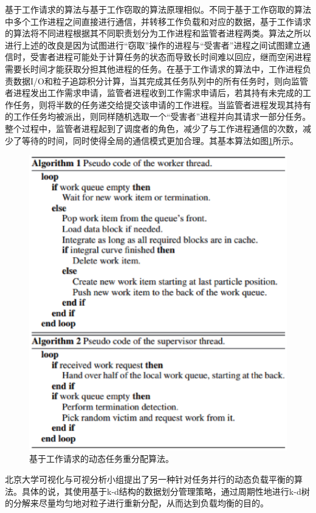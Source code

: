 基于工作请求的算法与基于工作窃取的算法原理相似。不同于基于工作窃取的算法中多个工作进程之间直接进行通信，并转移工作负载和对应的数据，基于工作请求的算法将不同进程根据其不同职责划分为工作进程和监管者进程两类\parencite{MullerCHG13}。算法之所以进行上述的改良是因为试图进行“窃取”操作的进程与“受害者”进程之间试图建立通信时，受害者进程可能处于计算任务的状态而导致长时间难以回应，继而空闲进程需要长时间才能获取分担其他进程的任务。在基于工作请求的算法中，工作进程负责数据I/O和粒子追踪积分计算，当其完成其任务队列中的所有任务时，则向监管者进程发出工作需求申请，监管者进程收到工作需求申请后，若其持有未完成的工作任务，则将半数的任务递交给提交该申请的工作进程。当监管者进程发现其持有的工作任务均被派出，则同样随机选取一个“受害者”进程并向其请求一部分任务。整个过程中，监管者进程起到了调度者的角色，减少了与工作进程通信的次数，减少了等待的时间，同时使得全局的通信模式更加合理。其基本算法如图\ref{fig:loadbalance:workrequesting}所示。

\begin{figure}[!tb]
  \centering
  \includegraphics[width=0.7\linewidth,keepaspectratio]{image/loadbalance/workrequesting.eps}
  \caption{
    基于工作请求的动态任务重分配算法\parencite{MullerCHG13}。
 }
\label{fig:loadbalance:workrequesting}
\end{figure}

北京大学可视化与可视分析小组提出了另一种针对任务并行的动态负载平衡的算法\parencite{ZhangGHYP18}。具体的说，其使用基于k-d结构的数据划分管理策略，通过周期性地进行k-d树的分解来尽量均匀地对粒子进行重新分配，从而达到负载均衡的目的。

